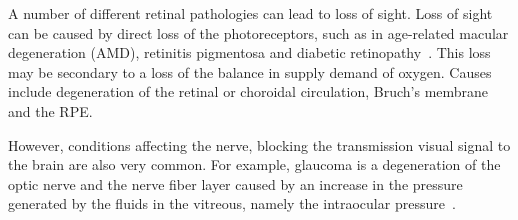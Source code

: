 \documentclass[12pt,a4paper]{journal}
\begin{document}
A number of different retinal pathologies can lead to loss of sight.
Loss of sight can be caused by direct loss of the photoreceptors, such as in age-related macular degeneration (AMD), retinitis pigmentosa and diabetic retinopathy~\cite{Gupta_2015, Birch_1999}.
This loss may be secondary to a loss of the balance in supply demand of oxygen.
Causes include degeneration of the retinal or choroidal circulation, Bruch's membrane and the RPE.


However, conditions affecting the nerve, blocking the transmission visual signal to the brain are also very common.
For example, glaucoma is a degeneration of the optic nerve and the nerve fiber layer caused by an increase in the pressure generated by the fluids in the vitreous, namely the intraocular pressure~\cite{Quigley_2011}.


{\normalsize }
\end{document}
